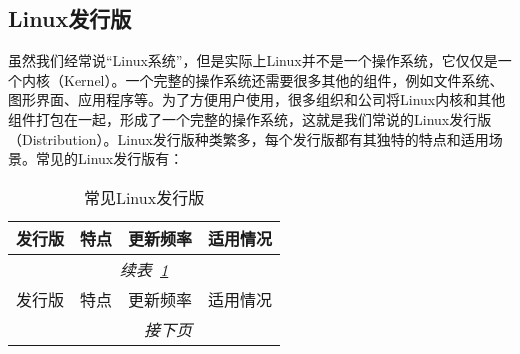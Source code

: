 \documentclass[../main.tex]{subfiles}
\begin{document}
\subsection{Linux发行版}

虽然我们经常说“Linux系统”，但是实际上Linux并不是一个操作系统，它仅仅是一个内核（Kernel）。一个完整的操作系统还需要很多其他的组件，例如文件系统、图形界面、应用程序等。为了方便用户使用，很多组织和公司将Linux内核和其他组件打包在一起，形成了一个完整的操作系统，这就是我们常说的Linux发行版（Distribution）。Linux发行版种类繁多，每个发行版都有其独特的特点和适用场景。常见的Linux发行版有：
\begin{small}
  \begin{longtable}[c]{l|lll}
    \caption{常见Linux发行版}\label{tab:linux-distros}\\
    \toprule
    发行版 & 特点 & 更新频率 & 适用情况 \\
    \midrule
    \endfirsthead          %

    \multicolumn{4}{c}{\footnotesize\itshape 续表~\ref{tab:linux-distros}}\\[.5ex]
    \toprule
    发行版 & 特点 & 更新频率 & 适用情况 \\
    \midrule
    \endhead               %

    \midrule
    \multicolumn{3}{r}{\footnotesize\itshape 接下页}
    \endfoot               %

    \bottomrule
    \endlastfoot


\end{longtable}
\end{small}
\end{document}
